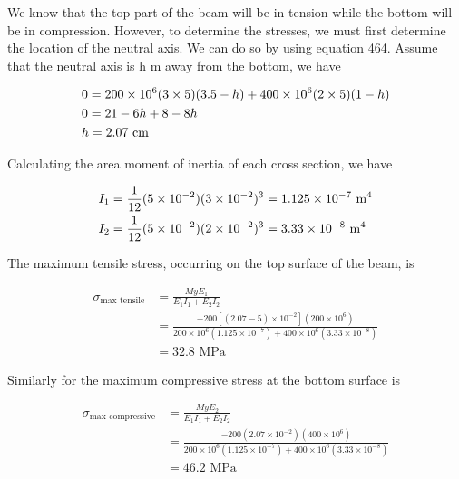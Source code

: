 \documentclass[
10pt,
a4paper,
openany,
svgnames,
]{book} %
\begin{document}
\begin{solution}
We know that the top part of the beam will be in tension while the bottom will be in compression. However, to determine the stresses, we must first determine the location of the neutral axis. We can do so by using equation 464. Assume that the neutral axis is h m away from the bottom, we have

\[\begin{gathered}
  0 = 200 \times {10^6}(3 \times 5)(3.5 - h) + 400 \times {10^6}(2 \times 5)(1 - h) \hfill \\
  0 = 21 - 6h + 8 - 8h \hfill \\
  h = 2.07 \text{ cm} \hfill \\ 
\end{gathered} \]	

Calculating the area moment of inertia of each cross section, we have

\[\begin{gathered}
  I_1 = \frac{1}{12}(5 \times 10^{ - 2})(3 \times 10^{-2})^3 = 1.125 \times 10^{-7} \text{ m}^4 \hfill \\
  I_2 = \frac{1}{12}(5 \times {10^{ - 2}})(2 \times 10^{-2})^3 = 3.33 \times 10^{ - 8} \text{ m}^4 \hfill \\ 
\end{gathered} \]	

The maximum tensile stress, occurring on the top surface of the beam, is

\begin{align*}
  \sigma_{\max \text{ tensile}} &= \frac{MyE_1}{E_1I_1 + E_2I_2} \\ 
                             &= \frac{-200[(2.07 - 5) \times 10^{ - 2}](200 \times 10^6)}{200 \times 10^6(1.125 \times 10^{-7}) + 400 \times 10^6(3.33 \times 10^{ - 8})} \\ 
                             &= 32.8 \text{ MPa} 
\end{align*}

Similarly for the maximum compressive stress at the bottom surface is

\begin{align*}
  \sigma_{\max \text{ compressive}} &= \frac{MyE_2}{E_1I_1 + E_2I_2} \\ 
                                 &= \frac{-200(2.07 \times 10^{ - 2})(400 \times 10^6)}{200 \times 10^6(1.125 \times 10^{-7}) + 400 \times 10^6(3.33 \times 10^{-8})} \\ 
                                 &= 46.2 \text{ MPa} 
\end{align*}
\end{solution}
	
\end{document}

